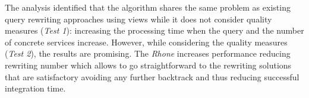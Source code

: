 The analysis identified that the algorithm shares the same problem as existing query rewriting 
approaches using views while it does not consider quality measures (\textit{Test 1}): 
increasing the processing time when the query and the number of concrete services increase. 
However, while considering the quality measures (\textit{Test 2}), the results are promising.  
The \textit{Rhone} increases performance reducing rewriting number which allows to go straightforward to the rewriting solutions that are satisfactory avoiding any further backtrack and thus reducing successful integration time.



